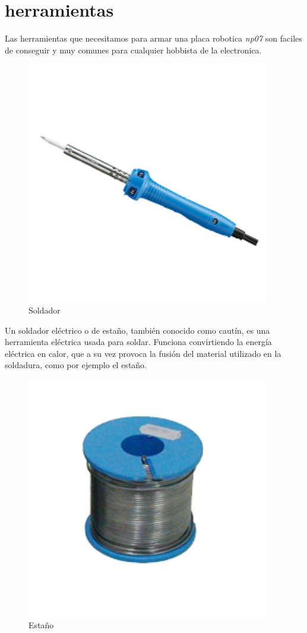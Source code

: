 \documentclass[letterpaper,10pt,english]{sphinxmanual}
\begin{document}
\section{herramientas}
\label{np07:herramientas}
Las herramientas que necesitamos para armar una placa robotica \emph{np07}
son faciles de conseguir y muy comunes para cualquier
hobbista de la electronica.
\begin{figure}[htbp]
\centering
\capstart

\includegraphics[width=300pt]{soldador.png}
\caption{Soldador}\end{figure}

Un soldador eléctrico o de estaño, también conocido como cautín, es
una herramienta eléctrica usada para soldar. Funciona convirtiendo
la energía eléctrica en calor, que a su vez provoca
la fusión del material utilizado en la soldadura, como por
ejemplo el estaño.
\newpage\begin{figure}[htbp]
\centering
\capstart

\includegraphics[width=300pt]{estanio.png}
\caption{Estaño}\end{figure}
\end{document}
